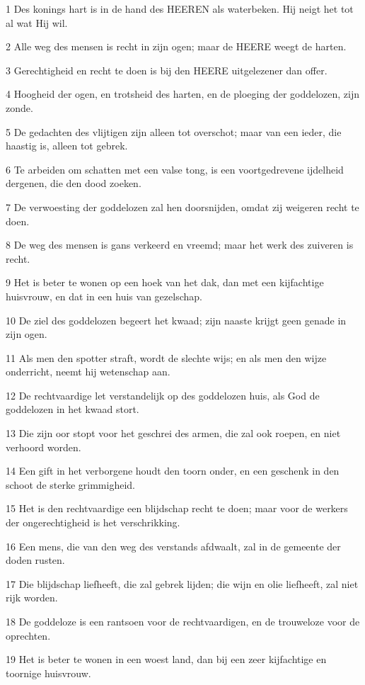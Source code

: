 \par 1 Des konings hart is in de hand des HEEREN als waterbeken. Hij neigt het tot al wat Hij wil.
\par 2 Alle weg des mensen is recht in zijn ogen; maar de HEERE weegt de harten.
\par 3 Gerechtigheid en recht te doen is bij den HEERE uitgelezener dan offer.
\par 4 Hoogheid der ogen, en trotsheid des harten, en de ploeging der goddelozen, zijn zonde.
\par 5 De gedachten des vlijtigen zijn alleen tot overschot; maar van een ieder, die haastig is, alleen tot gebrek.
\par 6 Te arbeiden om schatten met een valse tong, is een voortgedrevene ijdelheid dergenen, die den dood zoeken.
\par 7 De verwoesting der goddelozen zal hen doorsnijden, omdat zij weigeren recht te doen.
\par 8 De weg des mensen is gans verkeerd en vreemd; maar het werk des zuiveren is recht.
\par 9 Het is beter te wonen op een hoek van het dak, dan met een kijfachtige huisvrouw, en dat in een huis van gezelschap.
\par 10 De ziel des goddelozen begeert het kwaad; zijn naaste krijgt geen genade in zijn ogen.
\par 11 Als men den spotter straft, wordt de slechte wijs; en als men den wijze onderricht, neemt hij wetenschap aan.
\par 12 De rechtvaardige let verstandelijk op des goddelozen huis, als God de goddelozen in het kwaad stort.
\par 13 Die zijn oor stopt voor het geschrei des armen, die zal ook roepen, en niet verhoord worden.
\par 14 Een gift in het verborgene houdt den toorn onder, en een geschenk in den schoot de sterke grimmigheid.
\par 15 Het is den rechtvaardige een blijdschap recht te doen; maar voor de werkers der ongerechtigheid is het verschrikking.
\par 16 Een mens, die van den weg des verstands afdwaalt, zal in de gemeente der doden rusten.
\par 17 Die blijdschap liefheeft, die zal gebrek lijden; die wijn en olie liefheeft, zal niet rijk worden.
\par 18 De goddeloze is een rantsoen voor de rechtvaardigen, en de trouweloze voor de oprechten.
\par 19 Het is beter te wonen in een woest land, dan bij een zeer kijfachtige en toornige huisvrouw.
